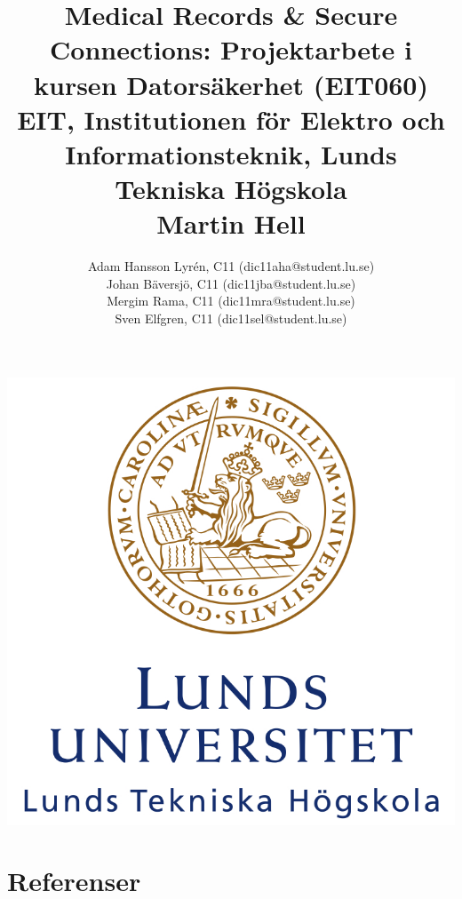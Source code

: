 \documentclass[a4paper]{article}
\title{
	Medical Records \& Secure Connections: Projektarbete i kursen Datorsäkerhet (EIT060)\\
	EIT, Institutionen för Elektro och Informationsteknik, Lunds Tekniska Högskola\\
	Martin Hell}
\author{
Adam Hansson Lyrén, C11 (dic11aha@student.lu.se)\\
Johan Bäversjö, C11 (dic11jba@student.lu.se)\\
Mergim Rama, C11 (dic11mra@student.lu.se)\\
Sven Elfgren, C11 (dic11sel@student.lu.se)\\
}
\begin{document}

\maketitle
\centerline{\includegraphics[scale = 0.6]{LTH.JPG}}
\thispagestyle{empty}
\newpage
\setcounter{page}{1}


\tableofcontents
\newpage











\section{Referenser}

\end{document}
